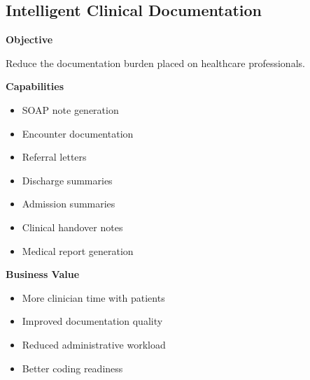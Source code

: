 \subsection{Intelligent Clinical Documentation}

\begin{capability}

\textbf{Objective}

Reduce the documentation burden placed on healthcare professionals.

\vspace{3mm}

\textbf{Capabilities}

\begin{itemize}

\item SOAP note generation

\item Encounter documentation

\item Referral letters

\item Discharge summaries

\item Admission summaries

\item Clinical handover notes

\item Medical report generation

\end{itemize}

\vspace{3mm}

\textbf{Business Value}

\begin{itemize}

\item More clinician time with patients

\item Improved documentation quality

\item Reduced administrative workload

\item Better coding readiness

\end{itemize}

\end{capability}


